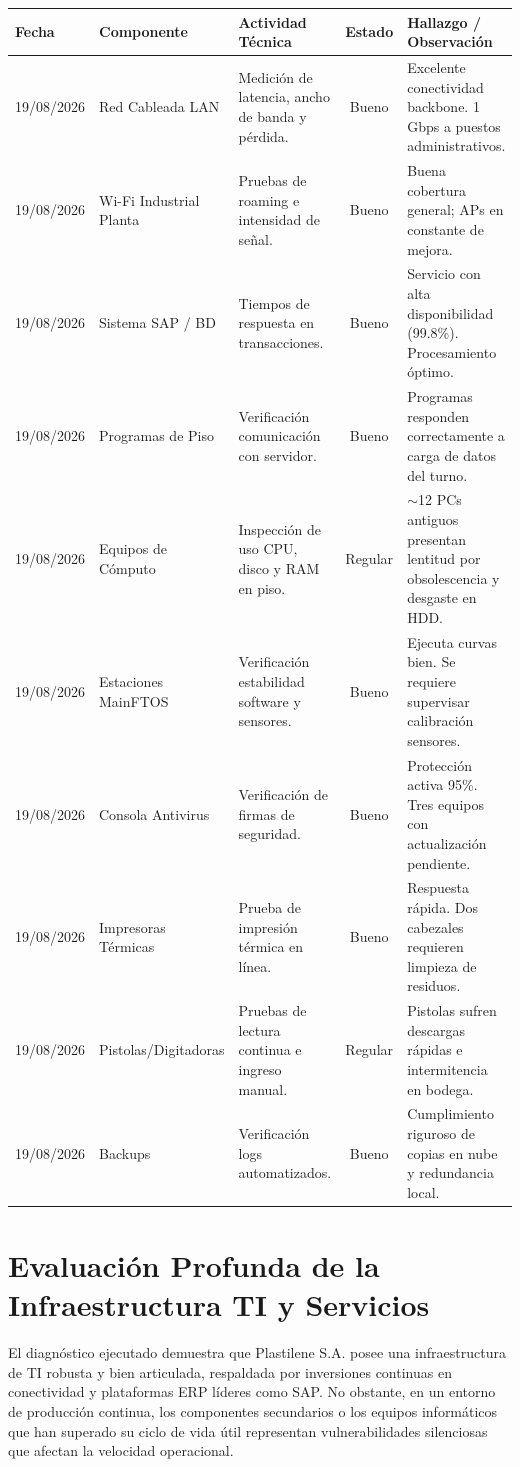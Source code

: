 		\vspace{0.5cm}
		\noindent
		\begin{tabularx}{\textwidth}{|p{2.3cm}|p{2.8cm}|X|c|p{4cm}|}
		\hline
		\textbf{Fecha} & \textbf{Componente} & \textbf{Actividad Técnica} & \textbf{Estado} & \textbf{Hallazgo / Observación} \\ \hline
		19/08/2026 & Red Cableada LAN & Medición de latencia, ancho de banda y pérdida. & Bueno & Excelente conectividad backbone. 1 Gbps a puestos administrativos. \\ \hline
		19/08/2026 & Wi-Fi Industrial Planta & Pruebas de roaming e intensidad de señal. & Bueno & Buena cobertura general; APs en constante de mejora. \\ \hline
		19/08/2026 & Sistema SAP / BD & Tiempos de respuesta en transacciones. & Bueno & Servicio con alta disponibilidad (99.8\%). Procesamiento óptimo. \\ \hline
		19/08/2026 & Programas de Piso & Verificación comunicación con servidor. & Bueno & Programas responden correctamente a carga de datos del turno. \\ \hline
		19/08/2026 & Equipos de Cómputo & Inspección de uso CPU, disco y RAM en piso. & Regular & $\sim$12 PCs antiguos presentan lentitud por obsolescencia y desgaste en HDD. \\ \hline
		19/08/2026 & Estaciones MainFTOS & Verificación estabilidad software y sensores. & Bueno & Ejecuta curvas bien. Se requiere supervisar calibración sensores. \\ \hline
		19/08/2026 & Consola Antivirus & Verificación de firmas de seguridad. & Bueno & Protección activa 95\%. Tres equipos con actualización pendiente. \\ \hline
		19/08/2026 & Impresoras Térmicas & Prueba de impresión térmica en línea. & Bueno & Respuesta rápida. Dos cabezales requieren limpieza de residuos. \\ \hline
		19/08/2026 & Pistolas/Digitadoras & Pruebas de lectura continua e ingreso manual. & Regular & Pistolas sufren descargas rápidas e intermitencia en bodega. \\ \hline
		19/08/2026 & Backups & Verificación logs automatizados. & Bueno & Cumplimiento riguroso de copias en nube y redundancia local. \\ \hline
		\end{tabularx}
		\vspace{0.5cm}
		
	\section{Evaluación Profunda de la Infraestructura TI y Servicios}
		El diagnóstico ejecutado demuestra que Plastilene S.A. posee una infraestructura de TI robusta y bien articulada, respaldada por inversiones continuas en conectividad y plataformas ERP líderes como SAP. No obstante, en un entorno de producción continua, los componentes secundarios o los equipos informáticos que han superado su ciclo de vida útil representan vulnerabilidades silenciosas que afectan la velocidad operacional.
		
